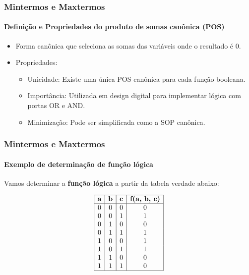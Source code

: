 \begin{frame}
	\frametitle{Mintermos e Maxtermos}
	\framesubtitle{Definição e Propriedades do produto de somas canônica (POS)}
	\begin{itemize}
		\item Forma canônica que seleciona as somas das variáveis onde o resultado é 0.
		\item Propriedades:
		\begin{itemize}
			\item Unicidade: Existe uma única POS canônica para cada função booleana.
			\item Importância: Utilizada em design digital para implementar lógica com portas OR e AND.
			\item Minimização: Pode ser simplificada como a SOP canônica.
		\end{itemize}
	\end{itemize}
\end{frame}


\begin{frame}
	\frametitle{Mintermos e Maxtermos}
	\framesubtitle{Exemplo de determinação de função lógica}
	
	\par Vamos determinar a \textbf{função lógica} a partir da tabela verdade abaixo:
	
	\[
	\begin{array}{|c|c|c|c|}
		\hline
		\textbf{a} & \textbf{b} & \textbf{c} & \textbf{f(a, b, c)} \\
		\hline
		0 & 0 & 0 & 0 \\
		0 & 0 & 1 & 1 \\
		0 & 1 & 0 & 0 \\
		0 & 1 & 1 & 1 \\
		1 & 0 & 0 & 1 \\
		1 & 0 & 1 & 1 \\
		1 & 1 & 0 & 0 \\
		1 & 1 & 1 & 0 \\
		\hline
	\end{array}
	\]
\end{frame}

